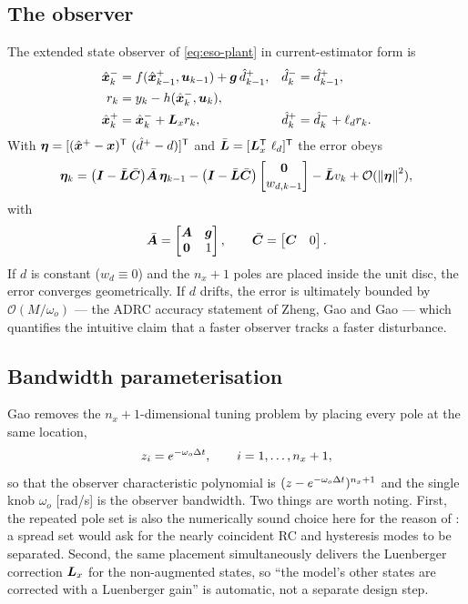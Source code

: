 \subsection{The observer}
The extended state observer of \eqref{eq:eso-plant} in current-estimator form is
\begin{align}
\hat{\bm{x}}^{-}_k &= f(\hat{\bm{x}}^{+}_{k-1},\bm{u}_{k-1}) + \bm{g}\,\hat{d}^+_{k-1} , &
\hat{d}^-_k &= \hat{d}^+_{k-1} , \label{eq:eso-pred}\\
r_k &= y_k - h(\hat{\bm{x}}^{-}_k,\bm{u}_k) , & & \label{eq:eso-res}\\
\hat{\bm{x}}^{+}_k &= \hat{\bm{x}}^{-}_k + \bm{L}_x r_k , &
\hat{d}^+_k &= \hat{d}^-_k + \ell_d r_k . \label{eq:eso-upd}
\end{align}
With $\bm{\eta} = [(\hat{\bm{x}}^{+}-\bm{x})^{\mathsf{T}}\ (\hat{d}^+-d)]^{\mathsf{T}}$ and
$\bar{\bm{L}} = [\bm{L}_x^{\mathsf{T}}\ \ell_d]^{\mathsf{T}}$ the error obeys
\begin{equation}
\bm{\eta}_k = \big(\bm{I} - \bar{\bm{L}}\bar{\bm{C}}\big)\bar{\bm{A}}\,\bm{\eta}_{k-1}
            - \big(\bm{I}-\bar{\bm{L}}\bar{\bm{C}}\big)\begin{bmatrix}\bm{0}\\ w_{d,k-1}\end{bmatrix}
            - \bar{\bm{L}}v_k + \mathcal{O}(\left\lVert \bm{\eta} \right\rVert^2) ,
\label{eq:eso-err}
\end{equation}
with
\begin{equation}
\bar{\bm{A}} = \begin{bmatrix}\bm{A} & \bm{g}\\ \bm{0} & 1\end{bmatrix} , \qquad
\bar{\bm{C}} = \begin{bmatrix}\bm{C} & 0\end{bmatrix} .
\label{eq:eso-aug}
\end{equation}
If $d$ is constant ($w_d\equiv0$) and the $n_x+1$ poles are placed inside the unit disc, the
error converges geometrically.  If $d$ drifts, the error is ultimately bounded by
$\mathcal{O}(M/\omega_o)$ --- the ADRC accuracy statement of Zheng, Gao and Gao
\cite{zheng2007adrcstability} --- which quantifies the intuitive claim that a faster observer
tracks a faster disturbance.

\subsection{Bandwidth parameterisation}
Gao \cite{gao2003bandwidth} removes the $n_x+1$-dimensional tuning problem by placing every pole
at the same location,
\begin{equation}
z_i = e^{-\omega_o \Delta t} , \qquad i = 1,\dots,n_x+1 ,
\label{eq:eso-poles}
\end{equation}
so that the observer characteristic polynomial is $(z - e^{-\omega_o\Delta t})^{n_x+1}$ and the single
knob $\omega_o$ [rad/s] is the observer bandwidth.  Two things are worth noting.  First, the
repeated pole set is also the numerically sound choice here for the reason of
: a spread set would ask for the nearly coincident RC and hysteresis modes
to be separated.  Second, the same placement simultaneously delivers the Luenberger correction
$\bm{L}_x$ for the non-augmented states, so ``the model's other states are corrected with a
Luenberger gain'' is automatic, not a separate design step.

